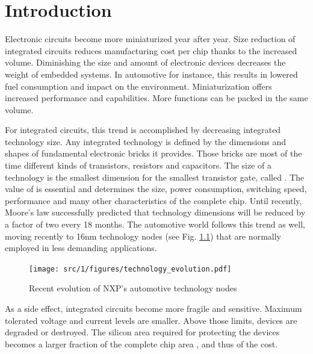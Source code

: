 \chapter{Introduction}

Electronic circuits become more miniaturized year after year.
Size reduction of integrated circuits reduces manufacturing cost per chip thanks to the increased volume.
Diminishing the size and amount of electronic devices decreases the weight of embedded systems.
In automotive for instance, this results in lowered fuel consumption and impact on the environment.
Miniaturization offers increased performance and capabilities.
More functions can be packed in the same volume.

For integrated circuits, this trend is accomplished by decreasing integrated technology size.
Any integrated technology is defined by the dimensions and shapes of fundamental electronic bricks it provides.
Those bricks are most of the time different kinds of transistors, resistors and capacitors.
The size of a technology is the smallest dimension for the smallest transistor gate, called \textlambda.
The value of \textlambda{} is essential and determines the size, power consumption, switching speed, performance and many other characteristics of the complete chip.
Until recently, Moore's law successfully predicted that technology dimensions will be reduced by a factor of two every 18 months.
The automotive world follows this trend as well, moving recently to 16nm technology nodes (see Fig. \ref{fig:nxp-techno-increase}) \cite{evolution_technologies} that are normally employed in less demanding applications.

\begin{figure}[!h]
  \centering
  \texttt{[image: src/1/figures/technology\_evolution.pdf]}
  \caption{Recent evolution of NXP's automotive technology nodes \cite{evolution_technologies}}
  \label{fig:nxp-techno-increase}
\end{figure}

As a side effect, integrated circuits become more fragile and sensitive.
Maximum tolerated voltage and current levels are smaller.
Above those limits, devices are degraded or destroyed.
The silicon area required for protecting the devices becomes a larger fraction of the complete chip area \cite{evolution_technologies}, and thus of the cost.

